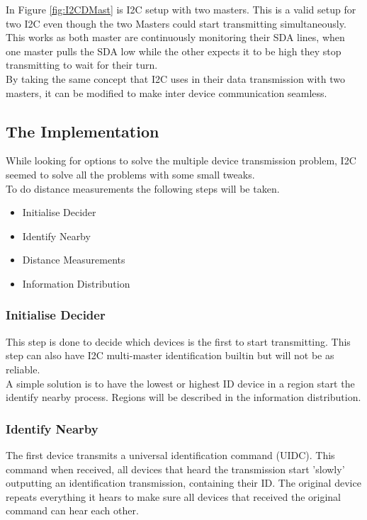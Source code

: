 \documentclass{article}
\begin{document}
In Figure \ref{fig:I2CDMast} is I2C setup with two masters. This is a valid setup for two I2C even though the two Masters could start transmitting simultaneously. This works as both master are continuously monitoring their SDA lines, when one master pulls the SDA low while the other expects it to be high they stop transmitting to wait for their turn.\\

By taking the same concept that I2C uses in their data transmission with two masters, it can be modified to make inter device communication seamless.

\subsection{The Implementation}
While looking for options to solve the multiple device transmission problem, I2C seemed to solve all the problems with some small tweaks.\\

To do distance measurements the following steps will be taken.

\begin{itemize}
\item Initialise Decider
\item Identify Nearby
\item Distance Measurements
\item Information Distribution
\end{itemize}

\subsubsection{Initialise Decider}
This step is done to decide which devices is the first to start transmitting. This step can also have I2C multi-master identification builtin but will not be as reliable.\\

A simple solution is to have the lowest or highest ID device in a region start the identify nearby process. Regions will be described in the information distribution.

\subsubsection{Identify Nearby}
The first device transmits a universal identification command (UIDC). This command when received, all devices that heard the transmission start 'slowly' outputting an identification transmission, containing their ID. The original device repeats everything it hears to make sure all devices that received the original command can hear each other.\\
\end{document}
